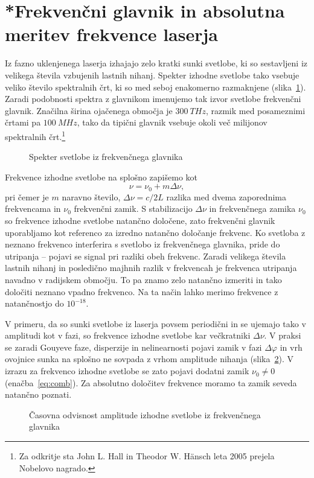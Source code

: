 \section{*Frekvenčni glavnik in absolutna meritev frekvence laserja}
Iz fazno uklenjenega laserja izhajajo zelo kratki sunki svetlobe, ki 
so sestavljeni iz velikega števila vzbujenih lastnih nihanj. Spekter 
izhodne svetlobe tako vsebuje veliko število spektralnih črt, ki
so med seboj enakomerno razmaknjene (slika~\ref{fig:comb}). Zaradi podobnosti spektra
z glavnikom imenujemo tak izvor svetlobe frekvenčni glavnik. Značilna širina ojačenega
območja je $300~\si{THz}$, razmik med posameznimi črtami pa $100~\si{MHz}$, tako 
da tipični glavnik vsebuje okoli več milijonov spektralnih črt.\footnote{Za odkritje 
sta John L. Hall in Theodor W. H\"ansch leta 2005 prejela 
Nobelovo nagrado.} 
\begin{figure}[h]
\centering
\def\svgwidth{110truemm} 

\caption{Spekter svetlobe iz frekvenčnega glavnika}
\label{fig:comb}
\end{figure}

Frekvence izhodne svetlobe na splošno zapišemo kot 
\begin{equation}
\nu = \nu_0 + m\Delta \nu,
\label{eq:comb}
\end{equation}
pri čemer je $m$ naravno število, $\Delta \nu = c/2L$ razlika med dvema zaporednima 
frekvencama in $\nu_0$ frekvenčni zamik. S stabilizacijo $\Delta \nu$ in 
frekvenčnega zamika $\nu_0$ so frekvence izhodne svetlobe  
natančno določene, zato frekvenčni glavnik uporabljamo kot referenco 
za izredno natančno določanje frekvenc. Ko svetloba z neznano frekvenco
interferira s svetlobo iz frekvenčnega glavnika, pride do utripanja -- pojavi
se signal pri razliki obeh frekvenc. Zaradi velikega števila lastnih nihanj 
in posledično majhnih razlik v frekvencah je frekvenca utripanja navadno v 
radijskem območju. To pa znamo zelo natančno izmeriti in tako določiti neznano 
vpadno frekvenco. Na ta način lahko merimo frekvence z natančnostjo do 
$10^{-18}$.

V primeru, da so sunki svetlobe iz laserja povsem periodični in se ujemajo tako
v amplitudi kot v fazi, so frekvence izhodne svetlobe kar 
večkratniki $\Delta \nu$. V praksi se zaradi Gouyeve faze,
disperzije in nelinearnosti pojavi zamik
v fazi $\Delta \varphi$ in vrh ovojnice sunka na splošno ne sovpada z vrhom amplitude
nihanja (slika~\ref{fig:comb2}). V izrazu za
frekvenco izhodne svetlobe se zato pojavi dodatni zamik $\nu_0 \neq 0$ (enačba~\ref{eq:comb}). 
Za absolutno
določitev frekvence moramo ta zamik seveda natančno poznati. 
\begin{figure}[h]
\centering
\def\svgwidth{110truemm} 

\caption{Časovna odvisnost amplitude izhodne svetlobe iz frekvenčnega glavnika}
\label{fig:comb2}
\end{figure}

